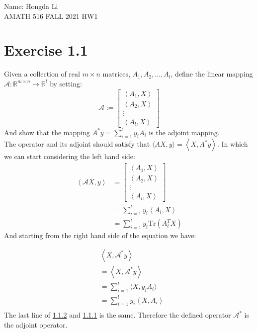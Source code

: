 \documentclass[]{article}
\begin{document}
\begin{center}
    Name: Hongda Li 
    \\
    AMATH 516 FALL 2021 HW1    
\end{center}

\section*{Exercise 1.1}\label{1.1}
    Given a collection of real $m\times n$ matrices, $A_1, A_2, \dots, A_l$, define the linear mapping $\mathcal{A}: \mathbb{R}^{m\times n} \mapsto \mathbb{R}^l$ by setting: 
    $$
        \mathcal{A} :=\begin{bmatrix}
            \left\langle A_1, X \right\rangle
            \\
            \left\langle A_2, X \right\rangle
            \\
            \vdots
            \\
            \left\langle A_l, X \right\rangle
        \end{bmatrix}
    $$
    And show that the mapping $A^* y = \sum_{i = 1}^{l}y_i A_i$ is the adjoint mapping. 
    \\
    The operator and its adjoint should satisfy that $\langle AX, y \rangle = \left\langle X, A^*y \right\rangle$. In which we can start considering the left hand side: 
    \begin{align*}\tag{1.1.1}\label{eqn:1.1.1}
        \left\langle \mathcal{A}X, y \right\rangle &= 
        \begin{bmatrix}
            \left\langle A_1, X \right\rangle
            \\
            \left\langle A_2, X \right\rangle
            \\
            \vdots
            \\
            \left\langle A_l, X \right\rangle
        \end{bmatrix}
        \\
        &= \sum_{i = 1}^{l}y_i \left\langle A_i, X \right\rangle
        \\
        &= \sum_{i = 1}^{l} y_i \text{Tr}(A_i^T X)
    \end{align*}
    And starting from the right hand side of the equation we have: 

    \begin{align*}\tag{1.1.2}\label{eqn:1.1.2}
        & \left\langle X, \mathcal{A}^*y \right\rangle 
        \\
        &= \left\langle X, \mathcal{A}^* y \right\rangle
        \\
        &= 
        \sum_{i = 1}^{l}\langle X, y_i A_i\rangle 
        \\
        &= 
        \sum_{i = 1}^{l} y_i \left\langle X, A_i \right\rangle
        \\
    \end{align*}
    The last line of \hyperref[eqn:1.1.2]{1.1.2} and \hyperref[eqn:1.1.1]{1.1.1} is the same. Therefore the defined operator $\mathcal{A}^*$ is the adjoint operator. 
\end{document}
